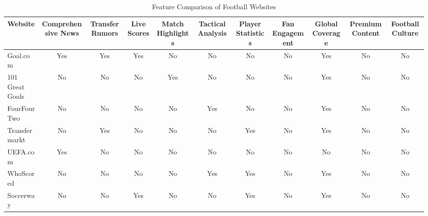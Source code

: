 \begin{table}[h!]
\centering
\caption{Feature Comparison of Football Websites}
\label{tab:feature-comparison}
\begin{tabularx}{\textwidth}{|l|c|c|c|c|c|c|c|c|c|c|}
\hline
\textbf{Website}               & \textbf{Comprehensive News} & \textbf{Transfer Rumors} & \textbf{Live Scores} & \textbf{Match Highlights} & \textbf{Tactical Analysis} & \textbf{Player Statistics} & \textbf{Fan Engagement} & \textbf{Global Coverage} & \textbf{Premium Content} & \textbf{Football Culture} \\
\hline
Goal.com              & Yes                    & Yes                 & Yes             & No                   & No                    & No                    & No                 & Yes                 & No                  & No                   \\
101 Great Goals       & No                     & No                  & No              & Yes                  & No                    & No                    & No                 & Yes                 & No                  & No                   \\
FourFourTwo           & No                     & No                  & No              & No                   & Yes                   & No                    & No                 & Yes                 & No                  & No                   \\
Transfermarkt         & No                     & Yes                 & No              & No                   & No                    & Yes                   & No                 & Yes                 & No                  & No                   \\
UEFA.com              & Yes                    & No                  & No              & No                   & No                    & No                    & No                 & No                  & No                  & No                   \\
WhoScored             & No                     & No                  & No              & No                   & Yes                   & Yes                   & No                 & Yes                 & No                  & No                   \\
Soccerway             & No                     & No                  & Yes             & No                   & No                    & Yes                   & No                 & Yes                 & No                  & No                   \\

\end{tabularx}
\end{table}
